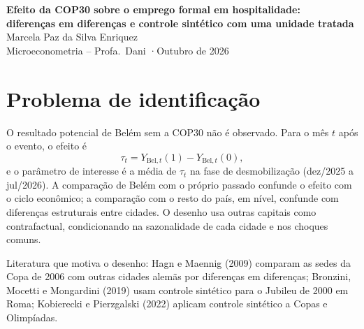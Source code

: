 \documentclass[11pt,a4paper]{article}
\begin{document}
\begin{center}
  {\Large\bfseries\color{azul} Efeito da COP30 sobre o emprego formal em hospitalidade:}\\[3pt]
  {\Large\bfseries\color{azul} diferenças em diferenças e controle sintético com uma unidade tratada}\\[8pt]
  Marcela Paz da Silva Enriquez\\
  Microeconometria -- Profa.\ Dani \quad·\quad Outubro de 2026
\end{center}

\vspace{4pt}
\noindent{}

\section{Problema de identificação}

O resultado potencial de Belém sem a COP30 não é observado. Para o mês $t$ após o evento, o efeito é
\begin{equation}
\tau_t = Y_{\text{Bel},t}(1) - Y_{\text{Bel},t}(0),
\end{equation}
e o parâmetro de interesse é a média de $\tau_t$ na fase de desmobilização (dez/2025 a jul/2026).
A comparação de Belém com o próprio passado confunde o efeito com o ciclo econômico; a comparação
com o resto do país, em nível, confunde com diferenças estruturais entre cidades. O desenho usa outras
capitais como contrafactual, condicionando na sazonalidade de cada cidade e nos choques comuns.

Literatura que motiva o desenho: Hagn e Maennig (2009) comparam as sedes da Copa de 2006 com outras
cidades alemãs por diferenças em diferenças; Bronzini, Mocetti e Mongardini (2019) usam controle
sintético para o Jubileu de 2000 em Roma; Kobierecki e Pierzgalski (2022) aplicam controle sintético
a Copas e Olimpíadas.

\end{document}
